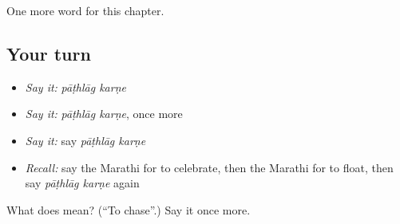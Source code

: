 \begin{grammarlens}[title={What you've built}]
One more word for this chapter.
\end{grammarlens}

\subsection*{Your turn}
\begin{itemize}
\raggedright
  \item \emph{Say it:} \emph{pāṭhlāg karṇe}
  \item \emph{Say it:} \emph{pāṭhlāg karṇe}, once more
  \item \emph{Say it:} say \emph{pāṭhlāg karṇe}
  \item \emph{Recall:} say the Marathi for to celebrate, then the Marathi for to float, then say \emph{pāṭhlāg karṇe} again
\end{itemize}

\begin{tcolorbox}[breakable,colback=teal!4,colframe=teal!35!black,title={Before you move on}]
What does   mean? (\textquotedblleft{}To chase\textquotedblright{}.) Say it once more.
\end{tcolorbox}
